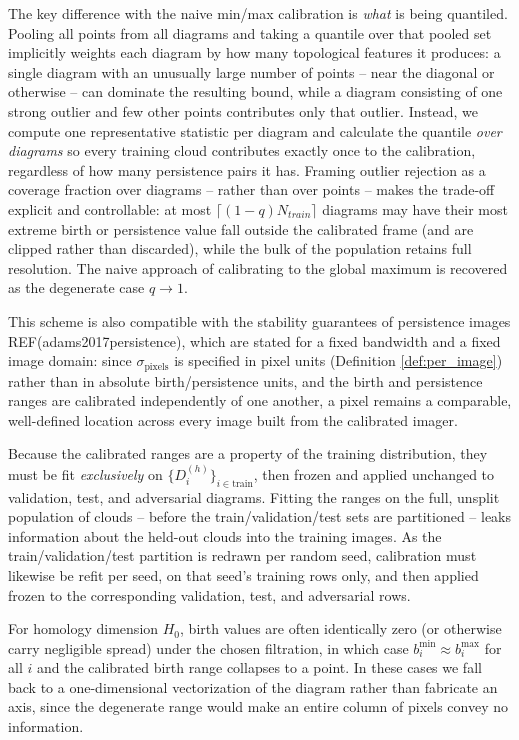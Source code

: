 \documentclass[11pt,letterpaper]{article}
\newcommand{\1}{\mathds{1}}
\theoremstyle{plain}
\theoremstyle{definitioncolon}
\begin{document}
The key difference with the naive min/max calibration is \emph{what} is being
quantiled. Pooling all points from all diagrams and taking a quantile over that
pooled set implicitly weights each diagram by how many topological features it
produces: a single diagram with an unusually large number of points -- near the
diagonal or otherwise -- can dominate the resulting bound, while a diagram
consisting of one strong outlier and few other points contributes only that
outlier. Instead, we compute one representative statistic per diagram and
calculate the quantile \emph{over diagrams} so every training cloud contributes exactly once to
the calibration, regardless of how many persistence pairs it has.
Framing outlier rejection as a coverage fraction over diagrams -- rather than
over points -- makes the trade-off explicit and controllable: at most
$\lceil (1-q) N_{train} \rceil$ diagrams may have their most extreme birth or
persistence value fall outside the calibrated frame (and are clipped rather than
discarded), while the bulk of the population retains full resolution. The naive
approach of calibrating to the global maximum is recovered as the degenerate case
$q \to 1$.

This scheme is also compatible with the stability guarantees of persistence
images REF(adams2017persistence), which are stated for a fixed bandwidth and a
fixed image domain: since $\sigma_{\text{pixels}}$ is specified in pixel units
(Definition \ref{def:per_image}) rather than in absolute birth/persistence units,
and the birth and persistence ranges are calibrated independently of one another,
a pixel remains a comparable, well-defined location across every image built from
the calibrated imager.

Because the calibrated ranges are a property of the training distribution, they
must be fit \emph{exclusively} on $\{D_i^{(h)}\}_{i \in \text{train}}$, then
frozen and applied unchanged to validation, test, and adversarial diagrams.
Fitting the ranges on the full, unsplit population of clouds -- before the
train/validation/test sets are partitioned -- leaks information about the held-out
clouds into the training images. As the
train/validation/test partition is redrawn per random seed, calibration must
likewise be refit per seed, on that seed's training rows only, and then applied
frozen to the corresponding validation, test, and adversarial rows.

For homology dimension $H_0$, birth values are often identically zero (or
otherwise carry negligible spread) under the chosen filtration, in which case
$b_i^{\min} \approx b_i^{\max}$ for all $i$ and the calibrated birth range
collapses to a point. In these cases we fall back to a
one-dimensional vectorization of the diagram rather than fabricate an axis, since
the degenerate range would make an entire column of pixels convey no information.
\end{document}
